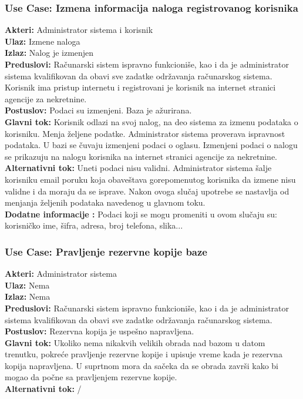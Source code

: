 \documentclass{article}
\begin{document}
\subsubsection{\bfseries Use Case: Izmena informacija naloga registrovanog korisnika}
{\bfseries Akteri:} Administrator sistema i korisnik\\
{\bfseries Ulaz:} Izmene naloga\\
{\bfseries Izlaz:} Nalog je izmenjen\\
{\bfseries Preduslovi:} Ra\v {c}unarski sistem ispravno funkcioni\v {s}e, kao i da je administrator sistema kvalifikovan da obavi sve zadatke odr\v {z}avanja ra\v {c}unarskog sistema. Korisnik ima pristup internetu i registrovani je korisnik na internet stranici agencije za nekretnine.\\
{\bfseries Postuslov:} Podaci su izmenjeni. Baza je a\v {z}urirana.\\
{\bfseries Glavni tok:} Korisnik odlazi na svoj nalog, na deo sistema za izmenu podataka o korisniku. Menja \v {z}eljene podatke. Administrator sistema proverava ispravnost podataka. U bazi se \v {c}uvaju izmenjeni podaci o oglasu. Izmenjeni podaci o nalogu se prikazuju na nalogu korisnika na internet stranici agencije za nekretnine.\\
{\bfseries Alternativni tok:} Uneti podaci nisu validni. Administrator sistema \v {s}alje korisniku email poruku koja obave\v {s}tava gorepomenutog korisnika da izmene nisu validne i da moraju da se isprave. Nakon ovoga slu\v {c}aj upotrebe se nastavlja od menjanja \v {z}eljenih podataka navedenog u glavnom toku.\\
{\bfseries Dodatne informacije :} Podaci koji se mogu promeniti u ovom slu\v {c}aju su: korisni\v {c}ko ime, \v {s}ifra, adresa, broj telefona, slika...\\
\subsubsection{\bfseries Use Case: Pravljenje rezervne kopije baze}
{\bfseries Akteri:} Administrator sistema\\
{\bfseries Ulaz:} Nema\\
{\bfseries Izlaz:} Nema\\
{\bfseries Preduslovi:} Ra\v {c}unarski sistem ispravno funkcioni\v {s}e, kao i da je administrator sistema kvalifikovan da obavi sve zadatke odr\v {z}avanja ra\v {c}unarskog sistema.\\
{\bfseries Postuslov:} Rezervna kopija je uspe\v {s}no napravljena.\\
{\bfseries Glavni tok:} Ukoliko nema nikakvih velikih obrada nad bazom u datom trenutku, pokre\' ce pravljenje rezervne kopije i upisuje vreme kada je rezervna kopija napravljena. U suprtnom mora da sa\v {c}eka da se obrada zavr\v {s}i kako bi mogao da po\v {c}ne sa pravljenjem rezervne kopije.\\
{\bfseries Alternativni tok:} /\\
\end{document}
